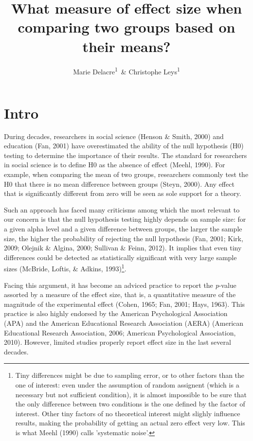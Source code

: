 \documentclass[
  man,floatsintext]{apa6}
\affiliation{
\vspace{0.5cm}
\textsuperscript{1} Université Libre de Bruxelles, Service of Analysis of the Data (SAD), Bruxelles, Belgium}
\title{What measure of effect size when comparing two groups based on their means?}
\author{Marie Delacre\textsuperscript{1}~\& Christophe Leys\textsuperscript{1}}
\date{}
\begin{document}
\maketitle

\hypertarget{intro}{%
\section{Intro}\label{intro}}

During decades, researchers in social science (Henson \& Smith, 2000) and education (Fan, 2001) have overestimated the ability of the null hypothesis (H0) testing to determine the importance of their results. The standard for researchers in social science is to define H0 as the absence of effect (Meehl, 1990). For example, when comparing the mean of two groups, researchers commonly test the H0 that there is no mean difference between groups (Steyn, 2000). Any effect that is significantly different from zero will be seen as sole support for a theory.

Such an approach has faced many criticisms among which the most relevant to our concern is that the null hypothesis testing highly depends on sample size: for a given alpha level and a given difference between groups, the larger the sample size, the higher the probability of rejecting the null hypothesis (Fan, 2001; Kirk, 2009; Olejnik \& Algina, 2000; Sullivan \& Feinn, 2012). It implies that even tiny differences could be detected as statistically significant with very large sample sizes (McBride, Loftis, \& Adkins, 1993)\footnote{Tiny differences might be due to sampling error, or to other factors than the one of interest: even under the assumption of random assignent (which is a necessary but not sufficient condition), it is almost impossible to be sure that the only difference between two conditions is the one defined by the factor of interest. Other tiny factors of no theoretical interest might slighly influence results, making the probability of getting an actual zero effect very low. This is what Meehl (1990) calls 'systematic noise'.}.

Facing this argument, it has become an adviced practice to report the \emph{p}-value assorted by a measure of the effect size, that is, a quantitative measure of the magnitude of the experimental effect (Cohen, 1965; Fan, 2001; Hays, 1963). This practice is also highly endorsed by the American Psychological Association (APA) and the American Educational Research Association (AERA) (American Educational Research Association, 2006; American Psychological Association, 2010). However, limited studies properly report effect size in the last several decades.
\end{document}
